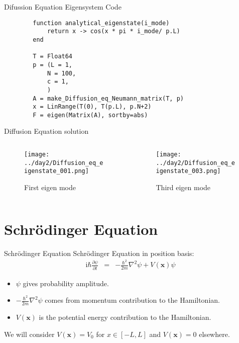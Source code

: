 \documentclass[aspectratio=169]{beamer}
\newcommand{\im}{\mathrm{i}} %
\begin{document}
\begin{frame}[fragile]{Difussion Equation Eigensystem Code}
    \begin{verbatim}
        function analytical_eigenstate(i_mode)
            return x -> cos(x * pi * i_mode/ p.L)
        end

        T = Float64
        p = (L = 1,
            N = 100,
            c = 1,
            )
        A = make_Diffusion_eq_Neumann_matrix(T, p)
        x = LinRange(T(0), T(p.L), p.N+2)
        F = eigen(Matrix(A), sortby=abs)
    \end{verbatim}
\end{frame}

\begin{frame}{Diffusion Equation solution}
    \begin{columns}
        \begin{column}{0.5\textwidth}
            \centering 
            \begin{figure}
            \texttt{[image: ../day2/Diffusion\_eq\_eigenstate\_001.png]} \\
            \caption{First eigen mode} 
            \end{figure}
        \end{column}

        \begin{column}{0.5\textwidth}
            \centering 
            \begin{figure}
            \texttt{[image: ../day2/Diffusion\_eq\_eigenstate\_003.png]} \\
            \caption{Third eigen mode} 
            \end{figure}
        \end{column}
    \end{columns}
\end{frame}



\section{Schr\"odinger Equation}

\begin{frame}{Schr\"odinger Equation}
    Schr\"odinger Equation in position basis:
    \begin{eqnarray}
        \im \hbar \frac{\partial \psi}{\partial t} & = & 
            -\frac{\hbar^2}{2m}\nabla^2 \psi + V(\bm{x}) \psi
    \end{eqnarray}
    \pause
    \begin{itemize}
        \item $\psi$  gives probability amplitude. 
        \item $-\frac{\hbar^2}{2m}\nabla^2 \psi$  comes from momentum contribution to the Hamiltonian. 
        \item $V(\bm{x})$ is the potential energy contribution to the Hamiltonian.
    \end{itemize}
    \pause
    We will consider $V(\bm{x}) = V_0$ for $x \in [-L, L]$ and $V(\bm{x}) = 0$ elsewhere. 
\end{frame}
\end{document}
